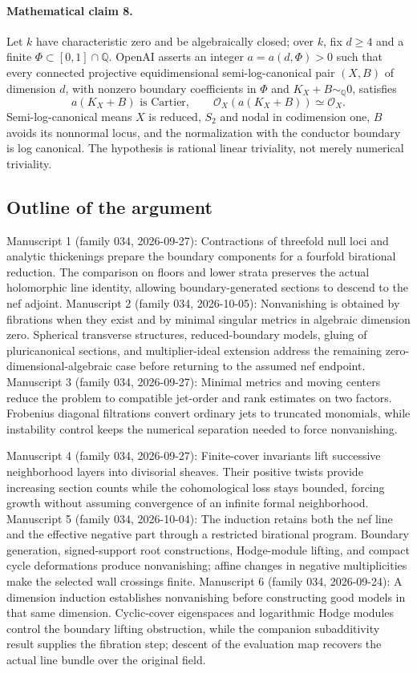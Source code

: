 \documentclass[11pt]{article}
\begin{document}
\paragraph{Mathematical claim 8.} Let $k$ have characteristic zero and be algebraically closed; over $k$, fix $d\ge4$ and a finite $\Phi\subset[0,1]\cap\mathbb Q$. OpenAI asserts an integer $a=a(d,\Phi)>0$ such that every connected projective equidimensional semi-log-canonical pair $(X,B)$ of dimension $d$, with nonzero boundary coefficients in $\Phi$ and $K_X+B\sim_{\mathbb Q}0$, satisfies
\[
a(K_X+B)\text{ is Cartier},\qquad \mathcal O_X(a(K_X+B))\simeq\mathcal O_X.
\]
Semi-log-canonical means $X$ is reduced, $S_2$ and nodal in codimension one, $B$ avoids its nonnormal locus, and the normalization with the conductor boundary is log canonical. The hypothesis is rational linear triviality, not merely numerical triviality.

\subsection{Outline of the argument}
Manuscript 1 (family 034, 2026-09-27): Contractions of threefold null loci and analytic thickenings prepare the boundary components for a fourfold birational reduction. The comparison on floors and lower strata preserves the actual holomorphic line identity, allowing boundary-generated sections to descend to the nef adjoint. Manuscript 2 (family 034, 2026-10-05): Nonvanishing is obtained by fibrations when they exist and by minimal singular metrics in algebraic dimension zero. Spherical transverse structures, reduced-boundary models, gluing of pluricanonical sections, and multiplier-ideal extension address the remaining zero-dimensional-algebraic case before returning to the assumed nef endpoint. Manuscript 3 (family 034, 2026-09-27): Minimal metrics and moving centers reduce the problem to compatible jet-order and rank estimates on two factors. Frobenius diagonal filtrations convert ordinary jets to truncated monomials, while instability control keeps the numerical separation needed to force nonvanishing.

Manuscript 4 (family 034, 2026-09-27): Finite-cover invariants lift successive neighborhood layers into divisorial sheaves. Their positive twists provide increasing section counts while the cohomological loss stays bounded, forcing growth without assuming convergence of an infinite formal neighborhood. Manuscript 5 (family 034, 2026-10-04): The induction retains both the nef line and the effective negative part through a restricted birational program. Boundary generation, signed-support root constructions, Hodge-module lifting, and compact cycle deformations produce nonvanishing; affine changes in negative multiplicities make the selected wall crossings finite. Manuscript 6 (family 034, 2026-09-24): A dimension induction establishes nonvanishing before constructing good models in that same dimension. Cyclic-cover eigenspaces and logarithmic Hodge modules control the boundary lifting obstruction, while the companion subadditivity result supplies the fibration step; descent of the evaluation map recovers the actual line bundle over the original field.
\end{document}
